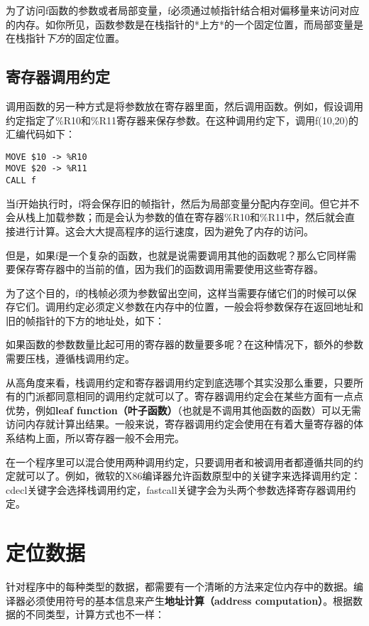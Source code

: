 \documentclass[cn,11pt,chinese]{elegantbook}
\begin{document}
为了访问f函数的参数或者局部变量，f必须通过帧指针结合相对偏移量来访问对应的内存。如你所见，函数参数是在栈指针的*上方*的一个固定位置，而局部变量是在栈指针\textit{下方}的固定位置。

\subsection{寄存器调用约定}

调用函数的另一种方式是将参数放在寄存器里面，然后调用函数。例如，假设调用约定指定了\%R10和\%R11寄存器来保存参数。在这种调用约定下，调用f(10,20)的汇编代码如下：

\begin{verbatim}
MOVE $10 -> %R10
MOVE $20 -> %R11
CALL f
\end{verbatim}

当f开始执行时，f将会保存旧的帧指针，然后为局部变量分配内存空间。但它并不会从栈上加载参数；而是会认为参数的值在寄存器\%R10和\%R11中，然后就会直接进行计算。这会大大提高程序的运行速度，因为避免了内存的访问。

但是，如果f是一个复杂的函数，也就是说需要调用其他的函数呢？那么它同样需要保存寄存器中的当前的值，因为我们的函数调用需要使用这些寄存器。

为了这个目的，f的栈帧必须为参数留出空间，这样当需要存储它们的时候可以保存它们。调用约定必须定义参数在内存中的位置，一般会将参数保存在返回地址和旧的帧指针的下方的地址处，如下：

如果函数的参数数量比起可用的寄存器的数量要多呢？在这种情况下，额外的参数需要压栈，遵循栈调用约定。

从高角度来看，栈调用约定和寄存器调用约定到底选哪个其实没那么重要，只要所有的门派都同意相同的调用约定就可以了。寄存器调用约定会在某些方面有一点点优势，例如\textbf{leaf function（叶子函数）}（也就是不调用其他函数的函数）可以无需访问内存就计算出结果。一般来说，寄存器调用约定会使用在有着大量寄存器的体系结构上面，所以寄存器一般不会用完。

在一个程序里可以混合使用两种调用约定，只要调用者和被调用者都遵循共同的约定就可以了。例如，微软的X86编译器允许函数原型中的关键字来选择调用约定：cdecl关键字会选择栈调用约定，fastcall关键字会为头两个参数选择寄存器调用约定。

\section{定位数据}

针对程序中的每种类型的数据，都需要有一个清晰的方法来定位内存中的数据。编译器必须使用符号的基本信息来产生\textbf{地址计算（address computation）}。根据数据的不同类型，计算方式也不一样：
\end{document}
